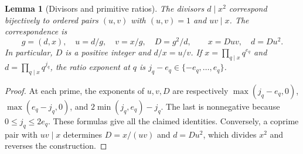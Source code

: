 \documentclass[11pt]{article}
\newtheorem{lemma}[theorem]{Lemma}
\theoremstyle{remark}\newtheorem{remark}[theorem]{Remark}
\begin{document}
\begin{lemma}[Divisors and primitive ratios]\label{lem:dictionary}
The divisors $d\mid x^2$ correspond bijectively to ordered pairs
$(u,v)$ with $(u,v)=1$ and $uv\mid x$. The correspondence is
\[
 g=(d,x),\quad u=d/g,\quad v=x/g,\quad D=g^2/d,
 \qquad x=Duv,\quad d=Du^2.
\]
In particular, $D$ is a positive integer and $d/x=u/v$.
If $x=\prod_{q\mid x}q^{e_q}$ and
$d=\prod_{q\mid x}q^{j_q}$, the ratio exponent at $q$ is
$j_q-e_q\in\{-e_q,\ldots,e_q\}$.
\end{lemma}
\begin{proof}
At each prime, the exponents of $u,v,D$ are respectively
$\max(j_q-e_q,0)$, $\max(e_q-j_q,0)$, and
$2\min(j_q,e_q)-j_q$. The last is nonnegative because
$0\le j_q\le2e_q$. These formulas give all the claimed identities.
Conversely, a coprime pair with $uv\mid x$ determines $D=x/(uv)$ and
$d=Du^2$, which divides $x^2$ and reverses the construction.
\end{proof}
\end{document}
